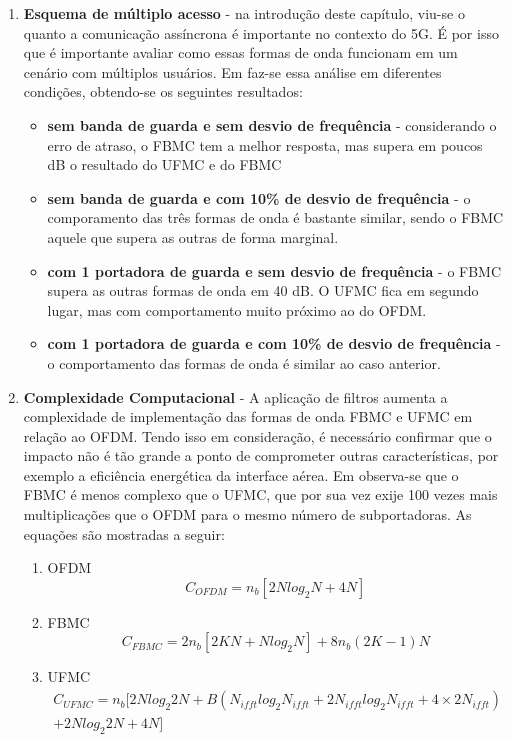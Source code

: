 \begin{enumerate}
\item \textbf{Esquema de múltiplo acesso} - na introdução deste capítulo, viu-se o quanto a comunicação assíncrona é importante no contexto do 5G. É por isso que é importante avaliar como essas formas de onda funcionam em um cenário com múltiplos usuários. Em \cite{Gerzaguet} faz-se essa análise em diferentes condições, obtendo-se os seguintes resultados:
\begin{itemize}
\item \textbf{sem banda de guarda e sem desvio de frequência} - considerando o erro de atraso, o FBMC tem a melhor resposta, mas supera em poucos dB o resultado do UFMC e do FBMC
\item \textbf{sem banda de guarda e com 10\% de desvio de frequência} - o comporamento das três formas de onda é bastante similar, sendo o FBMC aquele que supera as outras de forma marginal.
\item \textbf{com 1 portadora de guarda e sem desvio de frequência} - o FBMC supera as outras formas de onda em 40 dB. O UFMC fica em segundo lugar, mas com comportamento muito próximo ao do OFDM.
\item \textbf{com 1 portadora de guarda e com 10\% de desvio de frequência} - o comportamento das formas de onda é similar ao caso anterior.
\end{itemize} 

\item \textbf{Complexidade Computacional} - \label{complexidade} A aplicação de filtros aumenta a complexidade de implementação das formas de onda FBMC e UFMC em relação ao OFDM. Tendo isso em consideração, é necessário confirmar que o impacto não é tão grande a ponto de comprometer outras características, por exemplo a eficiência energética da interface aérea. Em \cite{Eeckhaute} observa-se que o FBMC é menos complexo que o UFMC, que por sua vez exije 100 vezes mais multiplicações que o OFDM para o mesmo número de subportadoras. As equações são mostradas a seguir:
\begin{enumerate}
\item OFDM 
\begin{equation}
C_{OFDM} = n_{b}[2Nlog_{2}N + 4N]
\end{equation}
\item FBMC
\begin{equation}
C_{FBMC} = 2n_{b}[2KN + Nlog_{2}N] + 8n_{b}(2K-1)N 
\end{equation}
\item UFMC
\begin{equation}
\begin{split} 
C_{UFMC} = n_{b}[2Nlog_{2}2N + B(N_{ifft}log_{2}N_{ifft} + 2N_{ifft}log_{2}N_{ifft} + 4\times2N_{ifft}) \\ 
+ 2Nlog_{2}2N + 4N] 	
\end{split}
\end{equation}
\end{enumerate}


\end{enumerate}
